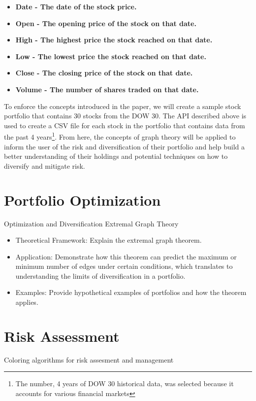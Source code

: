 \documentclass{article}
\begin{document}
\begin{itemize}
    \item \bf{Date} - The date of the stock price. 
    \item \bf{Open} - The opening price of the stock on that date.
    \item \bf{High} - The highest price the stock reached on that date.
    \item \bf{Low} - The lowest price the stock reached on that date.
    \item \bf{Close} - The closing price of the stock on that date.
    \item \bf{Volume} - The number of shares traded on that date.
\end{itemize}

To enforce the concepts introduced in the paper, we will create a sample stock portfolio that contains 30 stocks from the DOW 30. The API described above is used to create a CSV file for each stock in the portfolio that contains data from the past 4 years\footnote{The number, 4 years of DOW 30 historical data, was selected because it accounts for various financial markets}. From here, the concepts of graph theory will be applied to inform the user of the risk and diversification of their portfolio and help build a better understanding of their holdings and potential techniques on how to diversify and mitigate risk.

\section{Portfolio Optimization}

Optimization and Diversification
Extremal Graph Theory

\begin{itemize}
    \item Theoretical Framework: Explain the extremal graph theorem.
    \item Application: Demonstrate how this theorem can predict the maximum or minimum number of edges under certain conditions, which translates to understanding the limits of diversification in a portfolio.
    \item Examples: Provide hypothetical examples of portfolios and how the theorem applies.
\end{itemize}


\section{Risk Assessment}
Coloring algorithms for risk assesment and management
\end{document}
